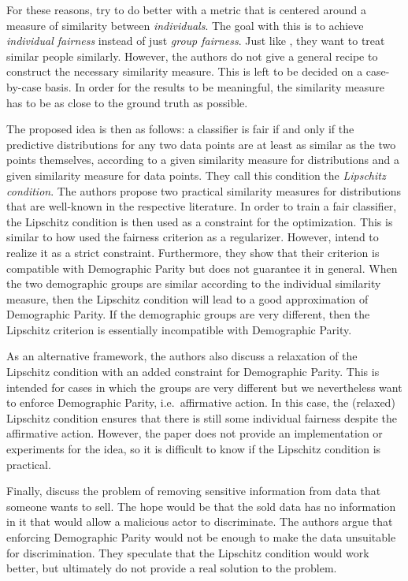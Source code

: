 For these reasons, \citet{dwork2012fairness} try to do better with a metric
that is centered around a measure of similarity between \emph{individuals}.
The goal with this is to achieve \emph{individual fairness} instead of just \emph{group fairness}.
Just like \citet{luong2011k}, they want to treat similar people similarly.
However, the authors do not give a general recipe to construct the necessary similarity measure.
This is left to be decided on a case-by-case basis.
In order for the results to be meaningful,
the similarity measure has to be as close to the ground truth as possible.

The proposed idea is then as follows: a classifier is fair
if and only if the predictive distributions for any two data points
are at least as similar as the two points themselves,
according to a given similarity measure for distributions
and a given similarity measure for data points.
They call this condition the \emph{Lipschitz condition}.
The authors propose two practical similarity measures for distributions
that are well-known in the respective literature.
In order to train a fair classifier,
the Lipschitz condition is then used as a constraint for the optimization.
This is similar to how \citet{kamishima2011fairness} used the fairness criterion as a regularizer.
However, \citet{dwork2012fairness} intend to realize it as a strict constraint.
Furthermore, they show that their criterion is compatible with Demographic Parity
but does not guarantee it in general.
When the two demographic groups are similar according to the individual similarity measure,
then the Lipschitz condition will lead to a good approximation of Demographic Parity.
If the demographic groups are very different,
then the Lipschitz criterion is essentially incompatible with Demographic Parity.

As an alternative framework,
the authors also discuss a relaxation of the Lipschitz condition with an added constraint for Demographic Parity.
This is intended for cases in which the groups are very different
but we nevertheless want to enforce Demographic Parity, i.e.~affirmative action.
In this case, the (relaxed) Lipschitz condition ensures
that there is still some individual fairness despite the affirmative action.
However, the paper does not provide an implementation or experiments for the idea,
so it is difficult to know if the Lipschitz condition is practical.

Finally, \citet{dwork2012fairness} discuss the problem of removing sensitive information
from data that someone wants to sell.
The hope would be that the sold data has no information in it
that would allow a malicious actor to discriminate.
The authors argue that enforcing Demographic Parity would not be enough
to make the data unsuitable for discrimination.
They speculate that the Lipschitz condition would work better,
but ultimately do not provide a real solution to the problem.

